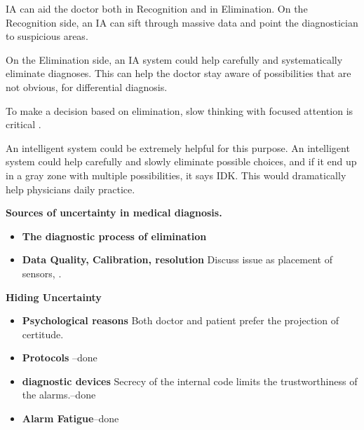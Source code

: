 \documentclass[11pt]{pnas-new}
\begin{document}
IA can aid the doctor both in Recognition and in Elimination. On the Recognition side, an IA can sift through massive data and point the diagnostician to suspicious areas.

On the Elimination side, an IA system could help carefully and systematically
eliminate diagnoses. This can help the doctor stay aware of possibilities that are not obvious, for differential diagnosis.


\iffalse
To make a decision based
on elimination, slow thinking with focused attention is critical
\cite{michel2020thinking}. 

An intelligent system could be extremely helpful for this
purpose. An intelligent system could help carefully and slowly
eliminate possible choices, and if it end up in a gray zone with
multiple possibilities, it says IDK. This would dramatically help
physicians daily practice.

{\bf Sources of uncertainty in medical diagnosis.}
\begin{itemize}
  \item{\bf The diagnostic process of elimination}
  \item{\bf Data Quality, Calibration, resolution} Discuss issue as placement of sensors, .
  \end{itemize}

 {\bf Hiding Uncertainty}
  \begin{itemize}
    \item {\bf Psychological reasons} Both doctor and patient prefer
      the projection of certitude.
    \item {\bf Protocols} --done
    \item {\bf diagnostic devices} Secrecy of the internal code limits
      the trustworthiness of the alarms.--done
    \item{\bf Alarm Fatigue}--done
  \end{itemize}
\end{document}
